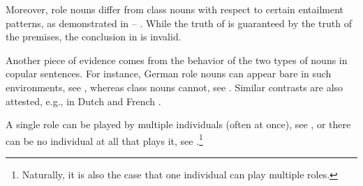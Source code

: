 \documentclass[output=paper]{langscibook}
\begin{document}
		\ea\label{wan:ex:judge-man-earn} \label{wan:ex:judge-earn}
		\label{wan:ex:man-earn}
		\z
        \z

\noindent Moreover, role nouns differ from class nouns with respect to certain entailment patterns, as demonstrated in -- \citep[see][]{landman1989groupsii}. While the truth of  is guaranteed by the truth of the premises, the conclusion in  is invalid. 
		
		\ea\label{wan:ex:man-hangman-strike} \label{wan:ex:man-strike}
		\label{wan:ex:man-hangman}
		\label{wan:ex:hangman-strike}
		\z
		\z
		
		\ea\label{wan:ex:judge-hangman-strike} \label{wan:ex:judge-strike}
		\label{wan:ex:judge-hangman}
		\label{wan:ex:hangman-strike-role}
		\z
		\z

\noindent Another piece of evidence comes from the behavior of the two types of nouns in copular sentences. For instance, German role nouns can appear bare in such environments, see , whereas class nouns cannot, see . Similar contrasts are also attested, e.g., in Dutch and French \citep{de-swart_winter_zwarts2007bare}. 

\ea\label{wan:ex:article-judge-man} \label{wan:ex:article-judge}
\label{wan:ex:article-man}
\z
\z

\noindent A single role can be played by multiple individuals (often at once), see , or there can be no individual at all that plays it, see .\footnote{Naturally, it is also the case that one individual can play multiple roles.}
		
\end{document}
